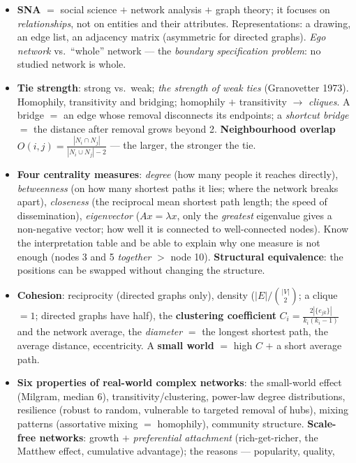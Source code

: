 \documentclass[11pt,a4paper]{article}
\theoremstyle{definition}
\providecommand{\uv}[1]{``#1''}
\begin{document}
\begin{itemize}
\item \textbf{SNA} $=$ social science $+$ network analysis $+$ graph theory; it focuses on
      \emph{relationships}, not on entities and their attributes. Representations: a drawing, an edge
      list, an adjacency matrix (asymmetric for directed graphs). \emph{Ego network} vs.\ \uv{whole}
      network --- the \emph{boundary specification problem}: no studied network is whole.
\item \textbf{Tie strength}: strong vs.\ weak; \emph{the strength of weak ties} (Granovetter 1973).
      Homophily, transitivity and bridging; homophily $+$ transitivity $\to$ \emph{cliques}. A bridge
      $=$ an edge whose removal disconnects its endpoints; a \emph{shortcut bridge} $=$ the distance
      after removal grows beyond 2. \textbf{Neighbourhood overlap}
      $O(i,j)=\frac{|N_i\cap N_j|}{|N_i\cup N_j|-2}$ --- the larger, the stronger the tie.
\item \textbf{Four centrality measures}: \emph{degree} (how many people it reaches directly),
      \emph{betweenness} (on how many shortest paths it lies; where the network breaks apart),
      \emph{closeness} (the reciprocal mean shortest path length; the speed of dissemination),
      \emph{eigenvector} ($Ax=\lambda x$, only the \emph{greatest} eigenvalue gives a non-negative
      vector; how well it is connected to well-connected nodes). Know the interpretation table and be
      able to explain why one measure is not enough (nodes 3 and 5 \emph{together} $>$ node 10).
      \textbf{Structural equivalence}: the positions can be swapped without changing the structure.
\item \textbf{Cohesion}: reciprocity (directed graphs only), density
      ($|E|/\binom{|V|}{2}$; a clique $=1$; directed graphs have half), the \textbf{clustering
      coefficient} $C_i=\frac{2|\{e_{jk}\}|}{k_i(k_i-1)}$ and the network average, the
      \emph{diameter} $=$ the longest shortest path, the average distance, eccentricity. A
      \textbf{small world} $=$ high $C$ $+$ a short average path.
\item \textbf{Six properties of real-world complex networks}: the small-world effect (Milgram, median
      6), transitivity/clustering, power-law degree distributions, resilience (robust to random,
      vulnerable to targeted removal of hubs), mixing patterns (assortative mixing $=$ homophily),
      community structure. \textbf{Scale-free networks}: growth $+$ \emph{preferential attachment}
      (rich-get-richer, the Matthew effect, cumulative advantage); the reasons --- popularity, quality,

\end{itemize}
\end{document}
